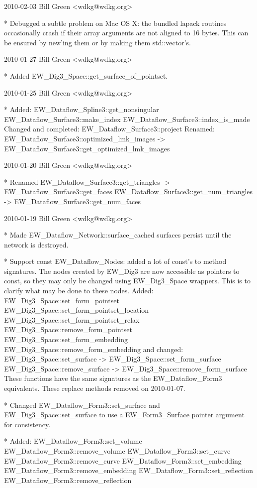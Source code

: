 \begin{DoxyVerbInclude}
2010-02-03  Bill Green  <wdkg@wdkg.org>

   * Debugged a subtle problem on Mac OS X: the bundled lapack routines
   occasionally crash if their array arguments are not aligned to 16 bytes.
   This can be ensured by new'ing them or by making them std::vector's.


2010-01-27  Bill Green  <wdkg@wdkg.org>

   * Added EW_Dig3_Space::get_surface_of_pointset.


2010-01-25  Bill Green  <wdkg@wdkg.org>

   * Added:
       EW_Dataflow_Spline3::get_nonsingular
       EW_Dataflow_Surface3::make_index
       EW_Dataflow_Surface3::index_is_made
   Changed and completed:
       EW_Dataflow_Surface3::project
   Renamed:
       EW_Dataflow_Surface3::optimized_lmk_images ->
        EW_Dataflow_Surface3::get_optimized_lmk_images


2010-01-20  Bill Green  <wdkg@wdkg.org>

    * Renamed
        EW_Dataflow_Surface3::get_triangles -> EW_Dataflow_Surface3::get_faces
        EW_Dataflow_Surface3::get_num_triangles ->
         EW_Dataflow_Surface3::get_num_faces


2010-01-19  Bill Green  <wdkg@wdkg.org>

    * Made EW_Dataflow_Network::surface_cached surfaces persist until the
    network is destroyed.

    * Support const EW_Dataflow_Nodes: added a lot of const's to method
    signatures.
    The nodes created by EW_Dig3 are now accessible as pointers to const, so
    they may only be changed using EW_Dig3_Space wrappers.
    This is to clarify what may be done to these nodes.
    Added:
        EW_Dig3_Space::set_form_pointset
        EW_Dig3_Space::set_form_pointset_location
        EW_Dig3_Space::set_form_pointset_relax
        EW_Dig3_Space::remove_form_pointset
        EW_Dig3_Space::set_form_embedding
        EW_Dig3_Space::remove_form_embedding
    and changed:
        EW_Dig3_Space::set_surface -> EW_Dig3_Space::set_form_surface
        EW_Dig3_Space::remove_surface -> EW_Dig3_Space::remove_form_surface
    These functions have the same signatures as the EW_Dataflow_Form3
    equivalents.
    These replace methods removed on 2010-01-07.

    * Changed EW_Dataflow_Form3::set_surface and EW_Dig3_Space::set_surface to
    use a EW_Form3_Surface pointer argument for consistency.

    * Added:
      EW_Dataflow_Form3::set_volume
      EW_Dataflow_Form3::remove_volume
      EW_Dataflow_Form3::set_curve
      EW_Dataflow_Form3::remove_curve
      EW_Dataflow_Form3::set_embedding
      EW_Dataflow_Form3::remove_embedding
      EW_Dataflow_Form3::set_reflection
      EW_Dataflow_Form3::remove_reflection



\end{DoxyVerbInclude}
